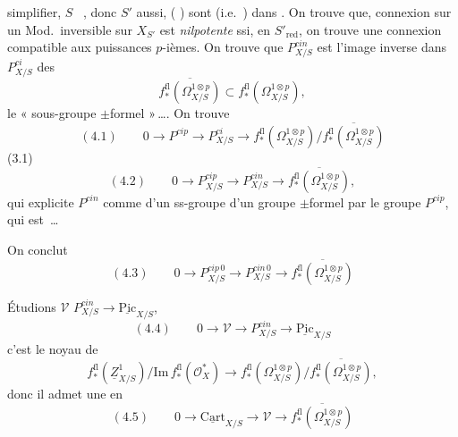 \documentclass[11pt,a4paper]{article}
\begin{document}
 simplifier,  $S$ \ , donc  $S'$ aussi,  ( \ill{}) sont \add{\ill{}} (i.e.\ ) dans   . On trouve que,  connexion  sur un Mod.\ inversible sur $X_{S'}$ est  \emph{nilpotente} ssi, en   $S'_{\mathrm{red}}$, on trouve une connexion compatible aux puissances $p$-ièmes. On trouve que $P^{cin}_{X/S}$ est l'image inverse dans $P^{ci}_{X/S}$ des 
\[
\overline{f^{\mathrm{fl}}_{*}(\Omega^{1\otimes p}_{X/S})} \subset f^{\mathrm{fl}}_{*}(\Omega^{1\otimes p}_{X/S}),
\]
 le «  sous-groupe $\pm$formel  »\,…. On trouve 
\[
(4.1) \qquad 0 \to P^{cip} \to P^{ci}_{X/S} \to f^{\mathrm{fl}}_{*}(\Omega^{1\otimes p}_{X/S})/\overline{f^{\mathrm{fl}}_{*}(\Omega^{1\otimes p}_{X/S})}
\]
 (3.1) 
\[
(4.2) \qquad 0 \to P^{cip}_{X/S} \to P^{cin}_{X/S} \to \overline{f^{\mathrm{fl}}_{*}(\Omega^{1\otimes p}_{X/S})},
\]
qui explicite $P^{cin}$ comme  d'un ss-groupe d'un groupe $\pm$formel par le groupe $P^{cip}$, qui est \,…

On conclut
\[
(4.3) \qquad 0 \to P^{cip\,0}_{X/S} \to P^{cin\,0}_{X/S} \to \overline{f^{\mathrm{fl}}_{*}(\Omega^{1\otimes p}_{X/S})}
\]

Étudions  $\mathcal{V}$  $P^{cin}_{X/S} \to \underline{\mathrm{Pic}}_{X/S}$,
\[
(4.4) \qquad 0 \to \mathcal{V} \to P^{cin}_{X/S} \to \underline{\mathrm{Pic}}_{X/S}
\]
c'est le noyau de
\[
f^{\mathrm{fl}}_{*}(\underline{Z}^{1}_{X/S})/\mathrm{Im}\, f^{\mathrm{fl}}_{*}(\mathcal{O}^{*}_{X}) \to f^{\mathrm{fl}}_{*}(\Omega^{1\otimes p}_{X/S})/\overline{f^{\mathrm{fl}}_{*}(\Omega^{1\otimes p}_{X/S})},
\]
donc il admet une  \struck{\ill{}} en
\[
(4.5) \qquad 0 \to \underline{\mathrm{Cart}}_{X/S} \to \mathcal{V} \to \overline{f^{\mathrm{fl}}_{*}(\Omega^{1\otimes p}_{X/S})}
\]
\end{document}

